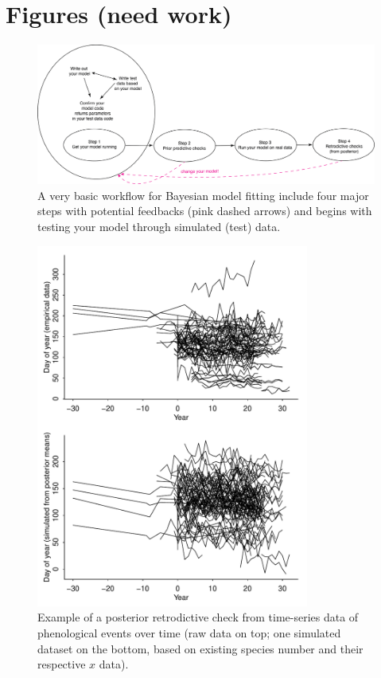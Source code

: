 \documentclass[11pt]{article}
\begin{document}
{\newpage
\section{Figures (need work)}

\begin{figure}[ht]
\centering
\noindent \includegraphics[width=1\textwidth]{figures/workflow.png}
\caption{A very basic workflow for Bayesian model fitting include four major steps with potential feedbacks (pink dashed arrows) and begins with testing your model through simulated (test) data.}
\label{fig:workflow}
\end{figure}

\begin{figure}[ht]
\centering
\noindent \includegraphics[width=0.8\textwidth]{examples/synchrony/graphs/rawvsonepredictivecheck.pdf}
\caption{Example of a posterior retrodictive check from time-series data of phenological events over time (raw data on top; one simulated dataset on the bottom, based on existing species number and their respective $x$ data).}
\label{fig:retrodictivecheck}
\end{figure}

}
\end{document}
